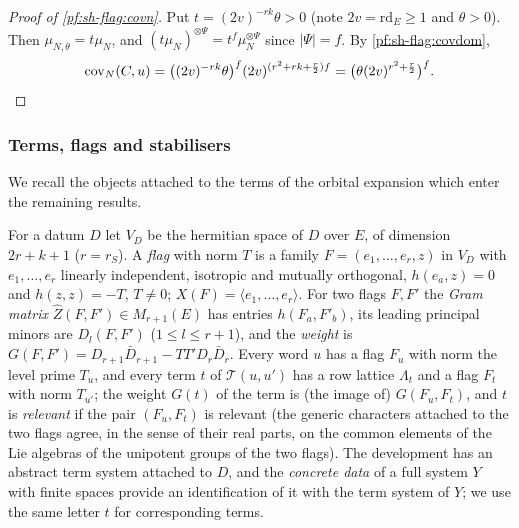 \begin{proof}[Proof of \cref{pf:sh-flag:covn}]
Put $t=(2v)^{-rk}\theta>0$ (note $2v=\mathrm{rd}_E\ge1$ and $\theta>0$). Then
$\mu_{N,\theta}=t\mu_N$, and $(t\mu_N)^{\otimes\Psi}=t^f\mu_N^{\otimes\Psi}$ since $|\Psi|=f$. By \cref{pf:sh-flag:covdom},
\[
\operatorname{cov}_N(C,u)=\bigl((2v)^{-rk}\theta\bigr)^f(2v)^{(r^2+rk+\frac r2)f}=\bigl(\theta(2v)^{r^2+\frac r2}\bigr)^f .
\qedhere
\]
\end{proof}

\subsubsection{Terms, flags and stabilisers}

We recall the objects attached to the terms of the orbital expansion which enter the remaining results.

\begin{definition}\label{pf:sh-flag:defflags}
For a datum $D$ let $V_D$ be the hermitian space of $D$ over $E$, of dimension $2r+k+1$ ($r=r_S$). A \emph{flag} with norm $T$ is a
family $F=(e_1,\dots,e_r,z)$ in $V_D$ with $e_1,\dots,e_r$ linearly independent, isotropic and mutually orthogonal,
$h(e_a,z)=0$ and $h(z,z)=-T$, $T\ne0$; $X(F)=\langle e_1,\dots,e_r\rangle$. For two flags $F,F'$ the \emph{Gram matrix}
$\widehat Z(F,F')\in M_{r+1}(E)$ has entries $h(F_a,F'_b)$, its leading principal minors are $D_l(F,F')$
($1\le l\le r+1$), and the \emph{weight} is $G(F,F')=D_{r+1}\bar D_{r+1}-TT'D_r\bar D_r$. Every word $u$ has a flag $F_u$ with
norm the level prime $T_u$, and every term $t$ of $\mathcal T(u,u')$ has a row lattice $\Lambda_t$ and a flag $F_t$ with norm
$T_{u'}$; the weight $G(t)$ of the term is (the image of) $G(F_u,F_t)$, and $t$ is \emph{relevant} if the pair $(F_u,F_t)$
is relevant (the generic characters attached to the two flags agree, in the sense of their real parts, on the common elements of
the Lie algebras of the unipotent groups of the two flags). The
development has an abstract term system attached to $D$, and the \emph{concrete data} of a full system $Y$ with finite
spaces provide an identification of it with the term system of $Y$; we use the same letter $t$ for corresponding
terms.
\ \
\ 
\end{definition}

